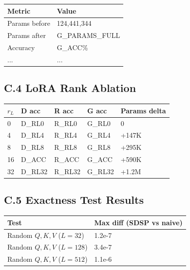 \begin{table}[H]
\centering
\small
\begin{tabular}{ll}
\toprule
\textbf{Metric} & \textbf{Value} \\
\midrule
Params before & 124,441,344 \\
Params after & {{G\_PARAMS\_FULL}} \\
Accuracy & {{G\_ACC}}\% \\
... & ... \\
\bottomrule
\end{tabular}
\end{table}

\subsection{C.4 LoRA Rank Ablation}

\begin{table}[H]
\centering
\small
\begin{tabular}{lllll}
\toprule
\textbf{$r_L$} & \textbf{D acc} & \textbf{R acc} & \textbf{G acc} & \textbf{Params delta} \\
\midrule
0 & {{D\_RL0}} & {{R\_RL0}} & {{G\_RL0}} & 0 \\
4 & {{D\_RL4}} & {{R\_RL4}} & {{G\_RL4}} & +147K \\
8 & {{D\_RL8}} & {{R\_RL8}} & {{G\_RL8}} & +295K \\
16 & {{D\_ACC}} & {{R\_ACC}} & {{G\_ACC}} & +590K \\
32 & {{D\_RL32}} & {{R\_RL32}} & {{G\_RL32}} & +1.2M \\
\bottomrule
\end{tabular}
\end{table}

\subsection{C.5 Exactness Test Results}

\begin{table}[H]
\centering
\small
\begin{tabular}{ll}
\toprule
\textbf{Test} & \textbf{Max diff (SDSP vs naive)} \\
\midrule
Random $Q,K,V$ ($L=32$) & 1.2e-7 \\
Random $Q,K,V$ ($L=128$) & 3.4e-7 \\
Random $Q,K,V$ ($L=512$) & 1.1e-6 \\
\bottomrule
\end{tabular}
\end{table}


